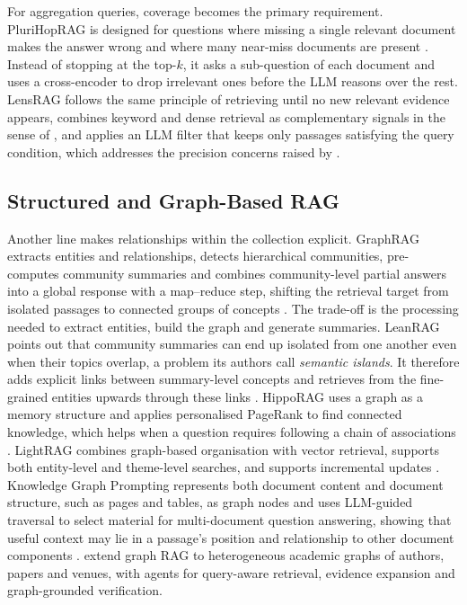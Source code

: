 \documentclass[11pt,letterpaper,oneside]{report}
\begin{document}
For aggregation queries, coverage becomes the primary requirement.
PluriHopRAG is designed for questions where missing a single relevant
document makes the answer wrong and where many near-miss documents are
present \citep{sveistrys2025plurihop}. Instead of stopping at the top-$k$, it
asks a sub-question of each document and uses a cross-encoder to drop
irrelevant ones before the LLM reasons over the rest. LensRAG follows the same principle of
retrieving until no new relevant evidence appears, combines keyword and dense
retrieval as complementary signals in the sense of
\citet{zheng2026migrascope}, and applies an LLM filter that keeps only
passages satisfying the query condition, which addresses the precision
concerns raised by \citet{peng2026neocorrag}.

\subsection{Structured and Graph-Based RAG}
Another line makes relationships within the collection explicit. GraphRAG
extracts entities and relationships, detects hierarchical communities,
pre-computes community summaries and combines community-level partial answers
into a global response with a map--reduce step, shifting the retrieval target
from isolated passages to connected groups of concepts
\citep{edge2024graphrag}. The trade-off is the processing needed to extract
entities, build the graph and generate summaries. LeanRAG points out that
community summaries can end up isolated from one another even when their
topics overlap, a problem its authors call \emph{semantic islands}. It
therefore adds explicit links between summary-level concepts and retrieves
from the fine-grained entities upwards through these links
\citep{zhang2026leanrag}. HippoRAG uses a graph as a
memory structure and applies personalised PageRank to find connected
knowledge, which helps when a question requires following a chain of
associations \citep{gutierrez2024hipporag,gutierrez2025hipporag2}. LightRAG
combines graph-based organisation with vector retrieval, supports both
entity-level and theme-level searches, and supports incremental updates
\citep{guo2024lightrag}. Knowledge Graph Prompting represents both document
content and document structure, such as pages and tables, as graph nodes and
uses LLM-guided traversal to select material for multi-document question
answering, showing that useful context may lie in a passage's position and
relationship to other document components \citep{wang2024kgp}.
\citet{jia2026heterograph} extend graph RAG to heterogeneous academic graphs
of authors, papers and venues, with agents for query-aware retrieval,
evidence expansion and graph-grounded verification.
\end{document}
